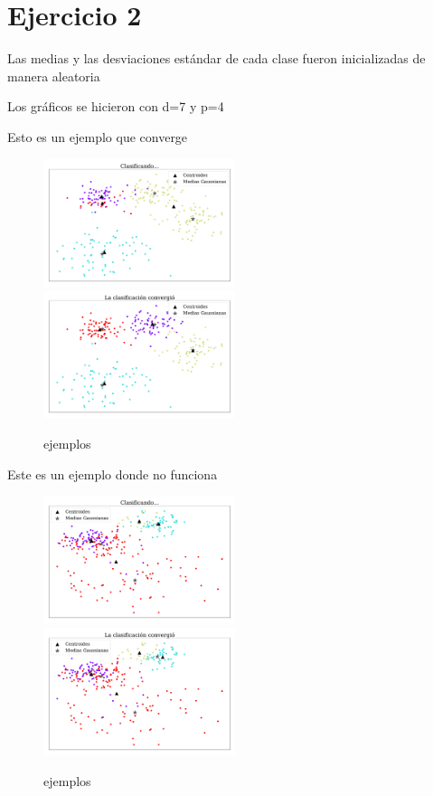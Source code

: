     \section*{Ejercicio 2}

    Las medias y las desviaciones estándar de cada clase fueron inicializadas de manera aleatoria

    Los gráficos se hicieron con d=7 y p=4


    Esto es un ejemplo que converge
    \begin{figure}[H]
        \centering
        \includegraphics[width=0.5\textwidth]{plots/ejer_2_clasificando_a_conv.pdf}
        \includegraphics[width=0.5\textwidth]{plots/ejer_2_si_converge.pdf}
        \caption{ejemplos}
        \label{fig:ejer2_converge}
    \end{figure}

    Este es un ejemplo donde no funciona

    \begin{figure}[H]
        \centering
        \includegraphics[width=0.5\textwidth]{plots/ejer_2_clasificando.pdf}
        \includegraphics[width=0.5\textwidth]{plots/ejer_2_no_converge.pdf}
        \caption{ejemplos}
        \label{fig:ejer2_no_converge}
    \end{figure}

